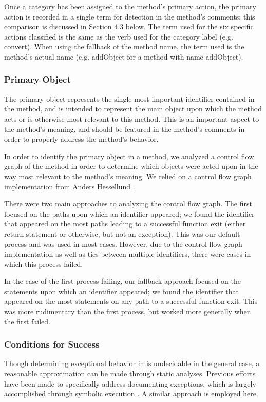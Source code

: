 \documentclass[preprint]{sigplanconf}
\begin{document}
Once a category has been assigned to the method's primary action, the primary action is recorded in a single term for detection in the method's comments; this comparison is discussed in Section 4.3 below. The term used for the six specific actions classified is the same as the verb used for the category label (e.g. convert). When using the fallback of the method name, the term used is the method's actual name (e.g. addObject for a method with name addObject).

\subsubsection{Primary Object}
The primary object represents the single most important identifier contained in the method, and is intended to represent the main object upon which the method acts or is otherwise most relevant to this method. This is an important aspect to the method's meaning, and should be featured in the method's comments in order to properly address the method's behavior.

In order to identify the primary object in a method, we analyzed a control flow graph of the method in order to determine which objects were acted upon in the way most relevant to the method's meaning. We relied on a control flow graph implementation from Anders Hessellund \cite{hessellund}.

There were two main approaches to analyzing the control flow graph. The first focused on the paths upon which an identifier appeared; we found the identifier that appeared on the most paths leading to a successful function exit (either return statement or otherwise, but not an exception). This was our default process and was used in most cases. However, due to the control flow graph implementation as well as ties between multiple identifiers, there were cases in which this process failed.

In the case of the first process failing, our fallback approach focused on the statements upon which an identifier appeared; we found the identifier that appeared on the most statements on any path to a successful function exit. This was more rudimentary than the first process, but worked more generally when the first failed.

\subsubsection{Conditions for Success}
Though determining exceptional behavior in is undecidable in the general case, a reasonable approximation can be made through static analyses. Previous efforts have been made to specifically address documenting exceptions, which is largely accomplished through symbolic execution \cite{buse08}. A similar approach is employed here.
\end{document}
